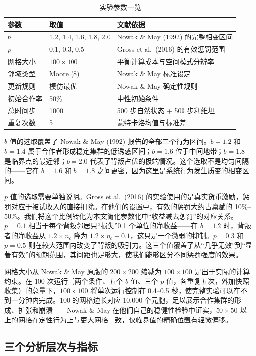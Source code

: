 \documentclass[12pt,a4paper]{ctexart}
\begin{document}
\begin{table}[H]
\centering
\caption{实验参数一览}
\begin{tabular}{@{}lll@{}}
\toprule
参数 & 取值 & 文献依据 \\
\midrule
$b$ & 1.2, 1.4, 1.6, 1.8, 2.0 & Nowak \& May (1992) 的完整相变区间 \\
$p$ & 0.1, 0.3, 0.5 & Gross et al.\ (2016) 的有效惩罚范围 \\
网格大小 & $100 \times 100$ & 平衡计算成本与空间模式分辨率 \\
邻域类型 & Moore (8) & Nowak \& May 标准设定 \\
更新规则 & 模仿最优 & Nowak \& May 确定性规则 \\
初始合作率 & 50\% & 中性初始条件 \\
总时间步 & 1000 & 500 步自然状态 + 500 步利维坦 \\
重复次数 & 5 & 蒙特卡洛均值与标准差 \\
\bottomrule
\end{tabular}
\end{table}

$b$ 值的选取覆盖了 Nowak \& May (1992) 报告的全部三个行为区间。$b=1.2$ 和 $b=1.4$ 属于合作者形成稳定集群的低诱惑区间；$b=1.6$ 位于中间地带；$b=1.8$ 是临界点的最近邻；$b=2.0$ 代表了背叛占优的极端情况。这个选取不是均匀间隔的——它在 $b=1.6$ 和 $b=1.8$ 之间更密，因为这里是系统行为发生质变的相变区间。

$p$ 值的选取需要单独说明。Gross et al.\ (2016) 的实验使用的是真实货币激励，惩罚对应于被试收入的直接扣除。在他们的设置中，有效的惩罚大约占禀赋的 10\%--50\%。我们将这个比例转化为本文简化参数化中“收益减去惩罚”的对应关系。$p=0.1$ 相当于每个背叛邻居只“损失”0.1 个单位的净收益——在 $b=1.2$ 时，背叛者的净收益从 $1.2 \times n_c$ 降为 $1.2 \times n_c - 0.1$，这只是一个微弱的抑制。$p=0.3$ 和 $p=0.5$ 则在较大范围内改变了背叛的吸引力。这三个值覆盖了从“几乎无效”到“显著有效”的预期范围，其间距也足够大，使我们能够区分不同惩罚强度的效果。

网格大小从 Nowak \& May 原版的 $200 \times 200$ 缩减为 $100 \times 100$ 是出于实际的计算约束。在 100 次运行（两个条件、五个 $b$ 值、三个 $p$ 值，各重复五次，外加快照收集）的总量下，$100 \times 100$ 将单次运行控制在 0.4--0.5 秒，使完整实验可以在不到一分钟内完成。100 的网格边长对应 10,000 个元胞，足以展示合作集群的形成、扩张和崩溃——Nowak \& May 在他们自己的稳健性检验中证实，$50 \times 50$ 以上的网格在定性行为上与更大网格一致，仅临界值的精确位置有轻微偏移。

\subsection{三个分析层次与指标}
\end{document}
